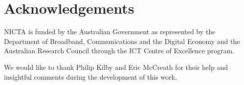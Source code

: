 \section{Acknowledgements}
NICTA is funded by the Australian Government as represented by the Department of 
Broadband, Communications and the Digital Economy and the Australian Research 
Council through the ICT Centre of Excellence program.
\par \indent
We would like to thank Philip Kilby and Eric McCreath for their help and insightful comments during the development of this work.

